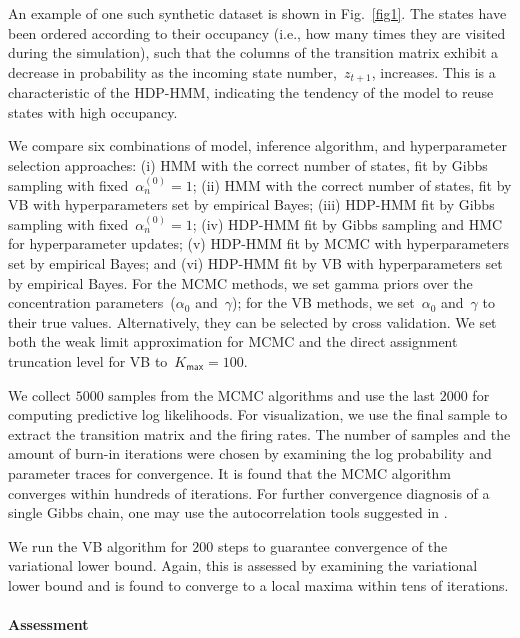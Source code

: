  An example of one such synthetic dataset is shown in
 Fig.~\ref{fig1}. The states have been ordered according to their
 occupancy (i.e., how many times they are visited during the
 simulation), such that the columns of the transition matrix exhibit a
 decrease in probability as the incoming state number,~$z_{t+1}$,
 increases. This is a characteristic of the HDP-HMM, indicating the
 tendency of the model to reuse states with high occupancy.

We compare six combinations of model, inference algorithm, and
hyperparameter selection approaches: (i) HMM with the correct number
of states, fit by Gibbs sampling with fixed~$\alpha_n^{(0)}=1$; (ii) HMM
with the correct number of states, fit by VB with hyperparameters set
by empirical Bayes; (iii) HDP-HMM fit by Gibbs sampling with
fixed~$\alpha_n^{(0)}=1$; (iv) HDP-HMM fit by Gibbs sampling and HMC for
hyperparameter updates; (v) HDP-HMM fit by MCMC with hyperparameters
set by empirical Bayes; and (vi) HDP-HMM fit by VB with
hyperparameters set by empirical Bayes. For the MCMC methods, we set
gamma priors over the concentration parameters~($\alpha_0$
and~$\gamma$); for the VB methods, we set~$\alpha_0$ and~$\gamma$ to
their true values. Alternatively, they can be selected by cross
validation. We set both the weak limit approximation for MCMC and the
direct assignment truncation level for VB to~${K_{\mathsf{max}}=100}$.

We collect $5000$ samples from the MCMC algorithms and use the last $2000$
for computing predictive log likelihoods. For visualization, we use
the final sample to extract the transition matrix and the firing
rates. The number of samples and the amount of burn-in iterations were
chosen by examining the log probability and parameter traces for
convergence. It is found that the MCMC algorithm converges within
hundreds of iterations. For further convergence diagnosis of a single
Gibbs chain, one may use the autocorrelation tools suggested in
\citep{RafteryLewis92,Cowles96}.

We run the VB algorithm for $200$ steps to guarantee convergence of the
variational lower bound. Again, this is assessed by examining the
variational lower bound and is found to converge to a local maxima
within tens of iterations.


\paragraph{Assessment} 

